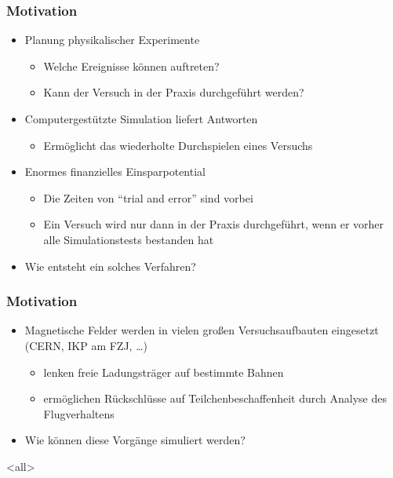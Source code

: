 \mode*
\begin{frame}
  \frametitle{Motivation}
  \begin{itemize}
    \item Planung physikalischer Experimente
    \begin{itemize}
      \item Welche Ereignisse k\"onnen auftreten?
      \item Kann der Versuch in der Praxis durchgef\"uhrt werden?
    \end{itemize}
    \item Computergest\"utzte Simulation liefert Antworten
      \begin{itemize}
        \item Erm\"oglicht das wiederholte Durchspielen eines Versuchs
      \end{itemize}
    \item Enormes finanzielles Einsparpotential
      \begin{itemize}
        \item Die Zeiten von "`trial and error"' sind vorbei
        \item Ein Versuch wird nur dann in der Praxis durchgef\"uhrt,
          wenn er vorher alle Simulationstests bestanden hat
      \end{itemize}
    \item Wie entsteht ein solches Verfahren?
  \end{itemize}
\end{frame}

\begin{frame}
  \frametitle{Motivation}
  \begin{itemize}
    \item Magnetische Felder werden in vielen gro{\ss}en
      Versuchsaufbauten eingesetzt (CERN, IKP am FZJ, \ldots)
    \begin{itemize}
      \item lenken freie Ladungstr\"ager auf bestimmte Bahnen
      \item erm\"oglichen R\"uckschl\"usse auf Teilchenbeschaffenheit
        durch Analyse des Flugverhaltens
    \end{itemize}
    \item Wie k\"onnen diese Vorg\"ange simuliert werden?
  \end{itemize}
\end{frame}
\mode<all>
